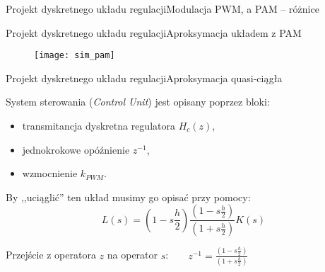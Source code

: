 \documentclass[11pt]{beamer}
\begin{document}
\begin{frame}{Projekt dyskretnego układu regulacji}{Modulacja PWM, a PAM -- różnice}

\begin{figure}[htbp!]
	\centering
	
	\hfill%
\end{figure}

\end{frame}



\begin{frame}{Projekt dyskretnego układu regulacji}{Aproksymacja układem z PAM}

\begin{figure}[htbp!]
	\centering
	\texttt{[image: sim\_pam]}
\end{figure}

\end{frame}


\begin{frame}{Projekt dyskretnego układu regulacji}{Aproksymacja quasi-ciągła}

System sterowania (\emph{Control Unit}) jest opisany poprzez bloki:
\begin{itemize}
\item transmitancja dyskretna regulatora $H_c(z)$,
\item jednokrokowe opóźnienie $z^{-1}$,
\item wzmocnienie $k_{PWM}$.
\end{itemize}

\vspace{0.5cm}

By ,,uciąglić'' ten układ musimy go opisać przy pomocy:
\[
L(s) =
	\left( 1 - s \frac{h}{2} \right)
	\frac{\left( 1 - s \frac{h}{2} \right)}{\left( 1 + s \frac{h}{2} \right)}
	K(s)
\]

\vspace{0.5cm}


Przejście z operatora $z$ na operator $s$:$ \qquad
z^{-1} = \frac{\left( 1 - s \frac{h}{2} \right)}{\left( 1 + s \frac{h}{2} \right)}
$

\end{frame}
\end{document}
